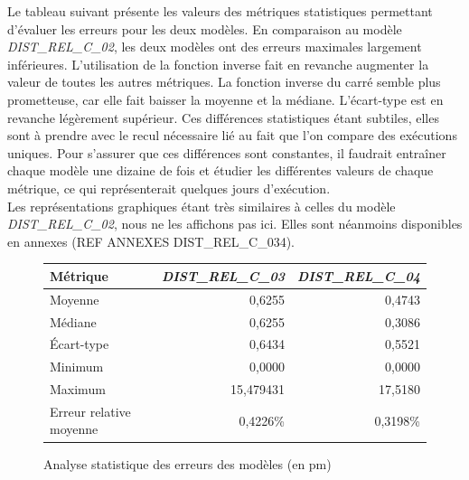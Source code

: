 Le tableau suivant présente les valeurs des métriques statistiques permettant d'évaluer les erreurs pour les deux modèles. En comparaison au modèle \emph{DIST\_REL\_C\_02}, les deux modèles ont des erreurs maximales largement inférieures. L'utilisation de la fonction inverse fait en revanche augmenter la valeur de toutes les autres métriques. La fonction inverse du carré semble plus prometteuse, car elle fait baisser la moyenne et la médiane. L'écart-type est en revanche légèrement supérieur. Ces différences statistiques étant subtiles, elles sont à prendre avec le recul nécessaire lié au fait que l'on compare des exécutions uniques. Pour s'assurer que ces différences sont constantes, il faudrait entraîner chaque modèle une dizaine de fois et étudier les différentes valeurs de chaque métrique, ce qui représenterait quelques jours d'exécution.\\

Les représentations graphiques étant très similaires à celles du modèle \emph{DIST\_REL\_C\_02}, nous ne les affichons pas ici. Elles sont néanmoins disponibles en annexes (REF ANNEXES DIST\_REL\_C\_034).

\begin{figure}[!h]
	\centering
	\begin{tabular}{|l|r|r|}
		\hline
		\textbf{Métrique}& \textbf{\emph{DIST\_REL\_C\_03}} & \textbf{\emph{DIST\_REL\_C\_04}} \\ \hline
		Moyenne & 0,6255 & 0,4743\\ \hline
		Médiane & 0,6255 & 0,3086 \\ \hline
		Écart-type & 0,6434 & 0,5521 \\ \hline
		Minimum & 0,0000 & 0,0000\\ \hline
		Maximum & 15,479431 & 17,5180\\ \hline
		Erreur relative moyenne & 0,4226\% & 0,3198\%\\ \hline
	\end{tabular}
	
	\caption{Analyse statistique des erreurs des modèles (en pm)}
\end{figure}

